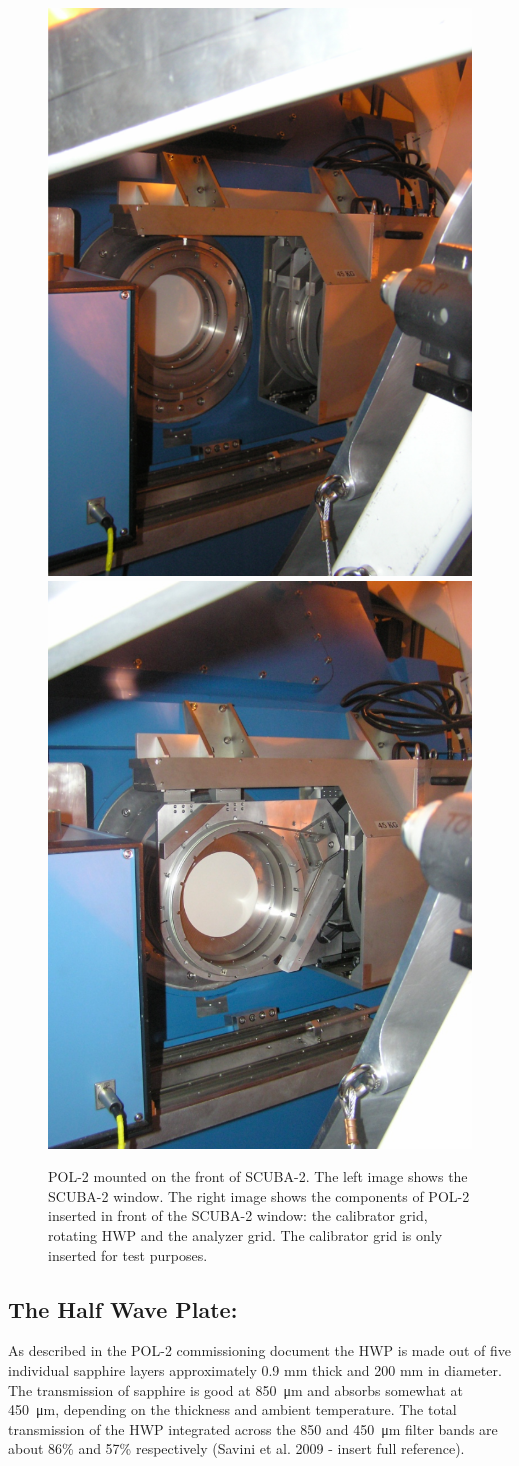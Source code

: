 \begin{figure}[t!]
\begin{center}
\includegraphics[width=0.45\linewidth]{pol2-out-of-beam.png}
\includegraphics[width=0.45\linewidth]{pol2-in-beam.png}
\label{fig:pol2sc2}
\caption [POL-2 mounted on SCUBA-2]{
  \small POL-2 mounted on the front of SCUBA-2. 
  The left image shows the SCUBA-2
  window. The right image shows the components of POL-2 inserted
  in front of the SCUBA-2 window: the calibrator grid, rotating HWP
  and the analyzer grid. The calibrator grid is only inserted
  for test purposes.
}
\end{center}
\end{figure}




\subsection*{The Half Wave Plate:}

As described in the POL-2 commissioning document 
the HWP is made out of five individual sapphire layers approximately 0.9
mm thick and 200 mm in diameter. The transmission of sapphire is good at
\SI{850}{\micro\metre} and absorbs somewhat at \SI{450}{\micro\metre}, depending on the thickness and ambient
temperature. The total transmission of the HWP integrated across the 850
and \SI{450}{\micro\metre} filter bands are about 86\% and 57\% respectively 
(Savini et al. 2009 - insert full reference).


